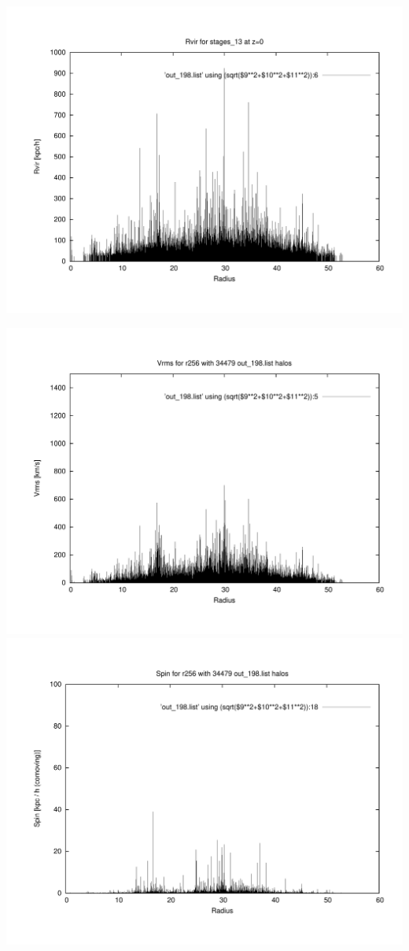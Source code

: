 \includegraphics[scale=0.3]{stages_13/plot_rvir_z0.pdf}

\includegraphics[scale=0.3]{stages_13/plot_Vrms_out_198.pdf}
\includegraphics[scale=0.3]{stages_13/plot_spin_out_198.pdf}

